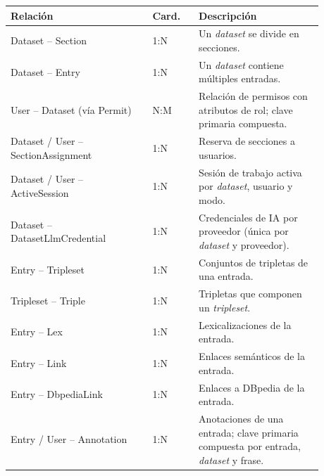 \begin{longtable}{|p{0.40\linewidth}|p{0.13\linewidth}|p{0.35\linewidth}|}
	\hline
	\textbf{Relación}                       & \textbf{Card.} & \textbf{Descripción}                                                                        \\
	\hline
	\endhead
	Dataset -- Section                      & 1:N            & Un \textit{dataset} se divide en secciones.                                                 \\ \hline
	Dataset -- Entry                        & 1:N            & Un \textit{dataset} contiene múltiples entradas.                                            \\ \hline
	User -- Dataset (vía Permit)            & N:M            & Relación de permisos con atributos de rol; clave primaria compuesta.                        \\ \hline
	Dataset / User -- SectionAssignment     & 1:N            & Reserva de secciones a usuarios.                                                            \\ \hline
	Dataset / User -- ActiveSession         & 1:N            & Sesión de trabajo activa por \textit{dataset}, usuario y modo.                              \\ \hline
	Dataset -- DatasetLlmCredential         & 1:N            & Credenciales de IA por proveedor (única por \textit{dataset} y proveedor).                  \\ \hline
	Entry -- Tripleset                      & 1:N            & Conjuntos de tripletas de una entrada.                                                      \\ \hline
	Tripleset -- Triple                     & 1:N            & Tripletas que componen un \textit{tripleset}.                                               \\ \hline
	Entry -- Lex                            & 1:N            & Lexicalizaciones de la entrada.                                                             \\ \hline
	Entry -- Link                           & 1:N            & Enlaces semánticos de la entrada.                                                           \\ \hline
	Entry -- DbpediaLink                    & 1:N            & Enlaces a DBpedia de la entrada.                                                            \\ \hline
	Entry / User -- Annotation              & 1:N            & Anotaciones de una entrada; clave primaria compuesta por entrada, \textit{dataset} y frase. \\ \hline

\end{longtable}
